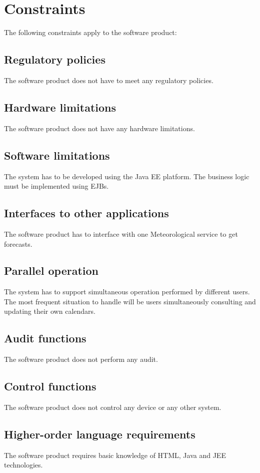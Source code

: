 \documentclass[10pt,a4paper,titlepage]{article}
\begin{document}
\section{Constraints}
The following constraints apply to the software product:

\subsection{Regulatory policies}
The software product does not have to meet any regulatory policies. 

\subsection{Hardware limitations}
The software product does not have any hardware limitations.

\subsection{Software limitations}
The system has to be developed using the Java EE platform. The business logic must be implemented using EJBs. 

\subsection{Interfaces to other applications}
The software product has to interface with one Meteorological service to get forecasts. 

\subsection{Parallel operation}
The system has to support simultaneous operation performed by different users. The most frequent situation to handle will be users simultaneously consulting and updating their own calendars. 

\subsection{Audit functions}
The software product does not perform any audit. 

\subsection{Control functions}
The software product does not control any device or any other system. 

\subsection{Higher-order language requirements}
The software product requires basic knowledge of HTML, Java and JEE technologies. 
\end{document}
